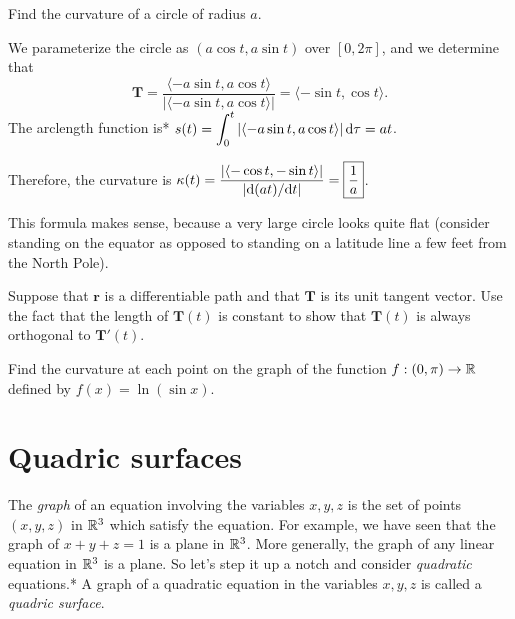 \documentclass{watsonbook}
\begin{document}
\begin{example}{}{}
  Find the curvature of a circle of radius $a$. 
\end{example}

\begin{solution}
  We parameterize the circle as $(a \cos t, a \sin t)$ over $[0,2\pi]$,
  and we determine that
  \[
    \mathbf{T} = \frac{\langle -a \sin t, a \cos t\rangle }{|\langle
      -a \sin t, a \cos t\rangle|} = \langle -\sin t, \cos t \rangle. 
  \]
  The arclength function is* $s(t) = \displaystyle{\int_0^t |\langle -a \sin t, a \cos
    t\rangle| \, \mathrm{d}\tau} = at$. 

  Therefore, the curvature is $\displaystyle{\kappa(t) = \frac{|\langle -\cos t, -\sin t
      \rangle|}{|\mathrm{d}(at)/\mathrm{d}t|} = \boxed{\frac{1}{a}}}$.

  This formula makes sense, because a very large circle looks quite flat
  (consider standing on the equator as opposed to standing on a
  latitude line a few feet from the North Pole).
\end{solution}

\begin{exercise}{}{}
  Suppose that $\mathbf{r}$ is a differentiable path and that
  $\mathbf{T}$ is its unit tangent vector. Use the fact that the
  length of $\mathbf{T}(t)$ is constant to show that $\mathbf{T}(t)$ is
  always orthogonal to $\mathbf{T}'(t)$.
\end{exercise}

\begin{exercise}{}{}
  Find the curvature at each point on the graph of the function
  $f:(0,\pi) \to \mathbb{R}$ defined by  $f(x) = \ln (\sin x)$. 
\end{exercise}

\section{Quadric surfaces} \label{sec:quadric_surfaces} 

The \textit{graph} of an equation involving the variables $x,y,z$ is
the set of points $(x,y,z)$ in $\mathbb{R}^3$ which satisfy the equation. For
example, we have seen that the graph of $x + y + z = 1$ is a plane in
$\mathbb{R}^3$. More generally, the graph of any linear equation in $\mathbb{R}^3$ is
a plane. So let's step it up a notch and consider \textit{quadratic}
equations.*  A graph of a quadratic
equation in the variables $x,y,z$ is called a \textit{quadric
  surface}. 
\end{document}
